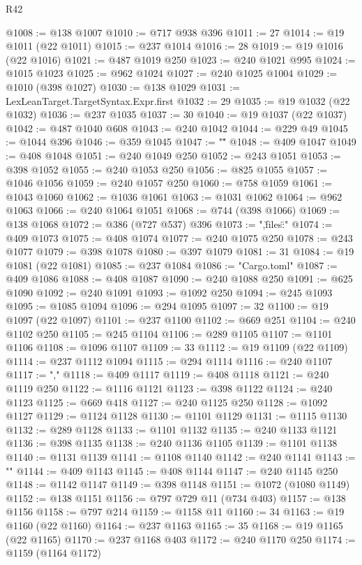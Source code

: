 \begin{lexlean}{R42}
\begin{coremodule}
@1008 := @138 @1007
@1010 := @717 @938 @396
@1011 := 27
@1014 := @19 @1011 (@22 @1011)
@1015 := @237 @1014
@1016 := 28
@1019 := @19 @1016 (@22 @1016)
@1021 := @487 @1019 @250
@1023 := @240 @1021 @995
@1024 := @1015 @1023
@1025 := @962 @1024
@1027 := @240 @1025 @1004
@1029 := @1010 (@398 @1027)
@1030 := @138 @1029
@1031 := LexLeanTarget.TargetSyntax.Expr.first
@1032 := 29
@1035 := @19 @1032 (@22 @1032)
@1036 := @237 @1035
@1037 := 30
@1040 := @19 @1037 (@22 @1037)
@1042 := @487 @1040 @608
@1043 := @240 @1042
@1044 := @229 @49
@1045 := @1044 @396
@1046 := @359 @1045
@1047 := "\""
@1048 := @409 @1047
@1049 := @408 @1048
@1051 := @240 @1049 @250
@1052 := @243 @1051
@1053 := @398 @1052
@1055 := @240 @1053 @250
@1056 := @825 @1055
@1057 := @1046 @1056
@1059 := @240 @1057 @250
@1060 := @758 @1059
@1061 := @1043 @1060
@1062 := @1036 @1061
@1063 := @1031 @1062
@1064 := @962 @1063
@1066 := @240 @1064 @1051
@1068 := @744 (@398 @1066)
@1069 := @138 @1068
@1072 := @386 (@727 @537) @396
@1073 := ",\"files\":{"
@1074 := @409 @1073
@1075 := @408 @1074
@1077 := @240 @1075 @250
@1078 := @243 @1077
@1079 := @398 @1078
@1080 := @397 @1079
@1081 := 31
@1084 := @19 @1081 (@22 @1081)
@1085 := @237 @1084
@1086 := "Cargo.toml"
@1087 := @409 @1086
@1088 := @408 @1087
@1090 := @240 @1088 @250
@1091 := @625 @1090
@1092 := @240 @1091
@1093 := @1092 @250
@1094 := @245 @1093
@1095 := @1085 @1094
@1096 := @294 @1095
@1097 := 32
@1100 := @19 @1097 (@22 @1097)
@1101 := @237 @1100
@1102 := @669 @251
@1104 := @240 @1102 @250
@1105 := @245 @1104
@1106 := @289 @1105
@1107 := @1101 @1106
@1108 := @1096 @1107
@1109 := 33
@1112 := @19 @1109 (@22 @1109)
@1114 := @237 @1112 @1094
@1115 := @294 @1114
@1116 := @240 @1107
@1117 := ","
@1118 := @409 @1117
@1119 := @408 @1118
@1121 := @240 @1119 @250
@1122 := @1116 @1121
@1123 := @398 @1122
@1124 := @240 @1123
@1125 := @669 @418
@1127 := @240 @1125 @250
@1128 := @1092 @1127
@1129 := @1124 @1128
@1130 := @1101 @1129
@1131 := @1115 @1130
@1132 := @289 @1128
@1133 := @1101 @1132
@1135 := @240 @1133 @1121
@1136 := @398 @1135
@1138 := @240 @1136 @1105
@1139 := @1101 @1138
@1140 := @1131 @1139
@1141 := @1108 @1140
@1142 := @240 @1141
@1143 := "}"
@1144 := @409 @1143
@1145 := @408 @1144
@1147 := @240 @1145 @250
@1148 := @1142 @1147
@1149 := @398 @1148
@1151 := @1072 (@1080 @1149)
@1152 := @138 @1151
@1156 := @797 @729 @11 (@734 @403)
@1157 := @138 @1156
@1158 := @797 @214
@1159 := @1158 @11
@1160 := 34
@1163 := @19 @1160 (@22 @1160)
@1164 := @237 @1163
@1165 := 35
@1168 := @19 @1165 (@22 @1165)
@1170 := @237 @1168 @403
@1172 := @240 @1170 @250
@1174 := @1159 (@1164 @1172)

\end{coremodule}
\end{lexlean}
